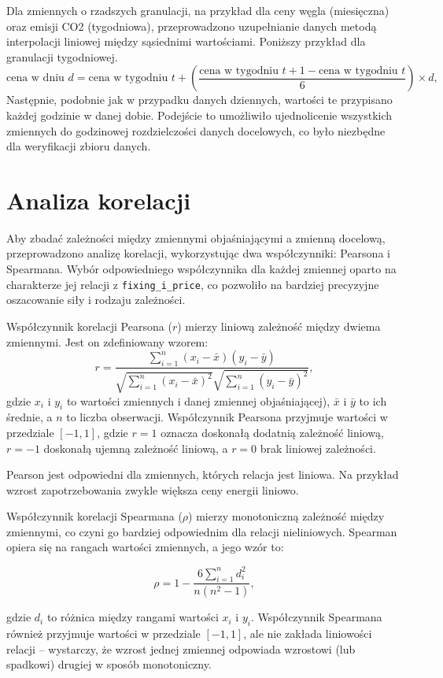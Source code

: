 Dla zmiennych o rzadszych granulacji, na przykład dla ceny węgla (miesięczna) oraz emisji CO2 (tygodniowa), przeprowadzono uzupełnianie danych metodą interpolacji liniowej między sąsiednimi wartościami. Poniższy przykład dla granulacji tygodniowej.
\[
\text{cena w dniu } d = \text{cena w tygodniu } t + \left( \frac{\text{cena w tygodniu } t+1 - \text{cena w tygodniu } t}{6} \right) \times d,
\]
Następnie, podobnie jak w przypadku danych dziennych, wartości te przypisano każdej godzinie w danej dobie. Podejście to umożliwiło ujednolicenie wszystkich zmiennych do godzinowej rozdzielczości danych docelowych, co było niezbędne dla weryfikacji zbioru danych.

\section{Analiza korelacji}

Aby zbadać zależności między zmiennymi objaśniającymi a zmienną docelową, przeprowadzono analizę korelacji, wykorzystując dwa współczynniki: Pearsona i Spearmana. Wybór odpowiedniego współczynnika dla każdej zmiennej oparto na charakterze jej relacji z \texttt{fixing\_i\_price}, co pozwoliło na bardziej precyzyjne oszacowanie siły i rodzaju zależności.

Współczynnik korelacji Pearsona (\( r \)) mierzy liniową zależność między dwiema zmiennymi. Jest on zdefiniowany wzorem:
\[
r = \frac{\sum_{i=1}^{n} (x_i - \bar{x})(y_i - \bar{y})}{\sqrt{\sum_{i=1}^{n} (x_i - \bar{x})^2} \sqrt{\sum_{i=1}^{n} (y_i - \bar{y})^2}},
\]
gdzie \( x_i \) i \( y_i \) to wartości zmiennych i danej zmiennej objaśniającej), \( \bar{x} \) i \( \bar{y} \) to ich średnie, a \( n \) to liczba obserwacji. Współczynnik Pearsona przyjmuje wartości w przedziale \([-1, 1]\), gdzie \( r = 1 \) oznacza doskonałą dodatnią zależność liniową, \( r = -1 \) doskonałą ujemną zależność liniową, a \( r = 0 \) brak liniowej zależności.

Pearson jest odpowiedni dla zmiennych, których relacja jest liniowa. Na przykład wzrost zapotrzebowania zwykle większa ceny energii liniowo.

Współczynnik korelacji Spearmana (\( \rho \)) mierzy monotoniczną zależność między zmiennymi, co czyni go bardziej odpowiednim dla relacji nieliniowych. Spearman opiera się na rangach wartości zmiennych, a jego wzór to:

\[
\rho = 1 - \frac{6 \sum_{i=1}^{n} d_i^2}{n(n^2 - 1)},
\]

gdzie \( d_i \) to różnica między rangami wartości \( x_i \) i \( y_i \). Współczynnik Spearmana również przyjmuje wartości w przedziale \([-1, 1]\), ale nie zakłada liniowości relacji – wystarczy, że wzrost jednej zmiennej odpowiada wzrostowi (lub spadkowi) drugiej w sposób monotoniczny.

